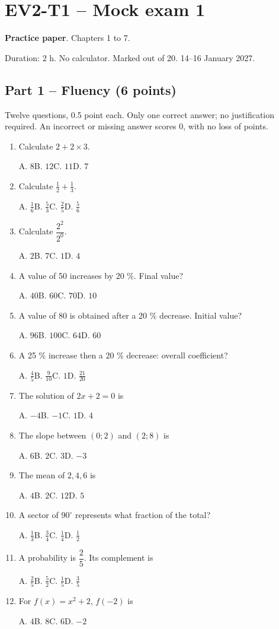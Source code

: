 \clearpage\section*{EV2-T1 -- Mock exam 1}\label{EV2-T1}
\textbf{Practice paper}. Chapters 1 to 7.\par Duration: 2 h. No calculator. Marked out of 20. 14--16 January 2027.
\subsection*{Part 1 -- Fluency (6 points)}
Twelve questions, 0.5 point each. Only one correct answer; no justification required. An incorrect or missing answer scores 0, with no loss of points.
\begin{enumerate}
\item Calculate $2+2\times3$.\par A. $8$\quad B. $12$\quad C. $11$\quad D. $7$
\item Calculate $\frac12+\frac13$.\par A. $\frac{1}{6}$\quad B. $\frac{5}{3}$\quad C. $\frac{2}{5}$\quad D. $\frac{5}{6}$
\item Calculate $\dfrac{2^2}{2^{0}}$.\par A. $2$\quad B. $7$\quad C. $1$\quad D. $4$
\item A value of 50 increases by 20 \%. Final value?\par A. $40$\quad B. $60$\quad C. $70$\quad D. $10$
\item A value of 80 is obtained after a 20 \% decrease. Initial value?\par A. $96$\quad B. $100$\quad C. $64$\quad D. $60$
\item A 25 \% increase then a 20 \% decrease: overall coefficient?\par A. $\frac{4}{5}$\quad B. $\frac{9}{10}$\quad C. $1$\quad D. $\frac{21}{20}$
\item The solution of $2x+2=0$ is\par A. $-4$\quad B. $-1$\quad C. $1$\quad D. $4$
\item The slope between $(0;2)$ and $(2;8)$ is\par A. $6$\quad B. $2$\quad C. $3$\quad D. $-3$
\item The mean of $2, 4, 6$ is\par A. $4$\quad B. $2$\quad C. $12$\quad D. $5$
\item A sector of $90^\circ$ represents what fraction of the total?\par A. $\frac{1}{3}$\quad B. $\frac{3}{4}$\quad C. $\frac{1}{4}$\quad D. $\frac{1}{2}$
\item A probability is $\dfrac{2}{5}$. Its complement is\par A. $\frac{2}{5}$\quad B. $\frac{5}{2}$\quad C. $\frac{1}{5}$\quad D. $\frac{3}{5}$
\item For $f(x)=x^2+2$, $f(-2)$ is\par A. $4$\quad B. $8$\quad C. $6$\quad D. $-2$
\end{enumerate}
